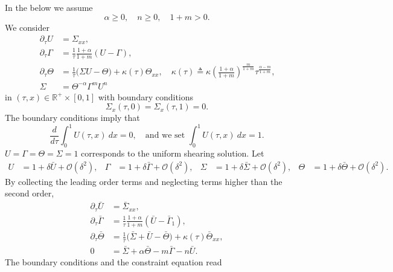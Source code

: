 \documentclass[a4paper,11pt]{article}
\theoremstyle{remark}
\begin{document}
In the below we assume
\begin{equation} \alpha\ge0, \quad n\ge0, \quad 1+m>0. \label{eq:range} \end{equation}
We consider
\begin{equation} \label{eq:system}
 \begin{aligned}
  \partial_\tau U &= \Sigma_{xx},\\
  \partial_\tau\Gamma &= \frac{1}{\tau}\frac{1+\alpha}{1+m}(U-\Gamma),\\
  \partial_\tau\Theta &= \frac{1}{\tau}\Big(\Sigma U -\Theta\Big) + \kappa(\tau)\Theta_{xx}, \quad \text{$\kappa(\tau)\triangleq\kappa\left(\frac{1+\alpha}{1+m}\right)^{\frac{m}{1+m}}\tau^{\frac{\alpha-m}{1+m}}$,}\\
  \Sigma &= \Theta^{-\alpha}\Gamma^m U^n
 \end{aligned}
\end{equation}
in $(\tau,x)\in \mathbb{R}^+\times [0,1]$ with boundary conditions
\begin{equation}
 \Sigma_x(\tau,0)=\Sigma_x(\tau,1)=0.
\end{equation}
The boundary conditions imply that
\begin{equation*} 
 \frac{d}{d\tau}\int_0^1 U(\tau,x) \: dx = 0, \quad \text{and we set } \int_0^1 U(\tau,x) \: dx = 1.
\end{equation*}
$ U=\Gamma=\Theta=\Sigma=1 $ corresponds to the uniform shearing solution.
Let
\begin{align*}
 U &= 1 + \delta \bar{U} + \mathcal{O}(\delta^2), & \Gamma &= 1 + \delta \bar\Gamma + \mathcal{O}(\delta^2), &
 \Sigma &= 1 + \delta \bar\Sigma + \mathcal{O}(\delta^2), & \Theta &= 1 + \delta \bar\Theta + \mathcal{O}(\delta^2).
\end{align*}
By collecting the leading order terms and neglecting terms higher than the  second order,
\begin{equation} \label{eq:linsystem}
 \begin{aligned}
  \partial_\tau \bar U &= \bar\Sigma_{xx},\\
  \partial_\tau \bar\Gamma &= \frac{1}{\tau}\frac{1+\alpha}{1+m}(\bar U-\bar\Gamma_1),\\
  \partial_\tau \bar\Theta &= \frac{1}{\tau}\Big(\bar\Sigma+ \bar U -\bar\Theta\Big) + \kappa(\tau)\bar\Theta_{xx},\\
  0&=\bar\Sigma + \alpha\bar\Theta -m\bar\Gamma - n\bar U .
 \end{aligned}
\end{equation}
The boundary conditions and the constraint equation read
\end{document}
